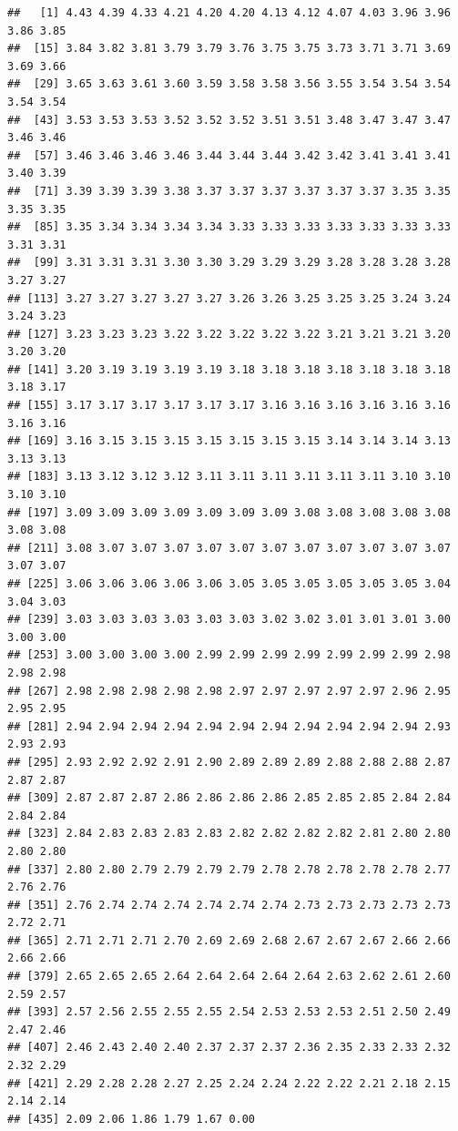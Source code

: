 \documentclass[11pt,]{article}
\begin{document}
\begin{verbatim}
##   [1] 4.43 4.39 4.33 4.21 4.20 4.20 4.13 4.12 4.07 4.03 3.96 3.96 3.86 3.85
##  [15] 3.84 3.82 3.81 3.79 3.79 3.76 3.75 3.75 3.73 3.71 3.71 3.69 3.69 3.66
##  [29] 3.65 3.63 3.61 3.60 3.59 3.58 3.58 3.56 3.55 3.54 3.54 3.54 3.54 3.54
##  [43] 3.53 3.53 3.53 3.52 3.52 3.52 3.51 3.51 3.48 3.47 3.47 3.47 3.46 3.46
##  [57] 3.46 3.46 3.46 3.46 3.44 3.44 3.44 3.42 3.42 3.41 3.41 3.41 3.40 3.39
##  [71] 3.39 3.39 3.39 3.38 3.37 3.37 3.37 3.37 3.37 3.37 3.35 3.35 3.35 3.35
##  [85] 3.35 3.34 3.34 3.34 3.34 3.33 3.33 3.33 3.33 3.33 3.33 3.33 3.31 3.31
##  [99] 3.31 3.31 3.31 3.30 3.30 3.29 3.29 3.29 3.28 3.28 3.28 3.28 3.27 3.27
## [113] 3.27 3.27 3.27 3.27 3.27 3.26 3.26 3.25 3.25 3.25 3.24 3.24 3.24 3.23
## [127] 3.23 3.23 3.23 3.22 3.22 3.22 3.22 3.22 3.21 3.21 3.21 3.20 3.20 3.20
## [141] 3.20 3.19 3.19 3.19 3.19 3.18 3.18 3.18 3.18 3.18 3.18 3.18 3.18 3.17
## [155] 3.17 3.17 3.17 3.17 3.17 3.17 3.16 3.16 3.16 3.16 3.16 3.16 3.16 3.16
## [169] 3.16 3.15 3.15 3.15 3.15 3.15 3.15 3.15 3.14 3.14 3.14 3.13 3.13 3.13
## [183] 3.13 3.12 3.12 3.12 3.11 3.11 3.11 3.11 3.11 3.11 3.10 3.10 3.10 3.10
## [197] 3.09 3.09 3.09 3.09 3.09 3.09 3.09 3.08 3.08 3.08 3.08 3.08 3.08 3.08
## [211] 3.08 3.07 3.07 3.07 3.07 3.07 3.07 3.07 3.07 3.07 3.07 3.07 3.07 3.07
## [225] 3.06 3.06 3.06 3.06 3.06 3.05 3.05 3.05 3.05 3.05 3.05 3.04 3.04 3.03
## [239] 3.03 3.03 3.03 3.03 3.03 3.03 3.02 3.02 3.01 3.01 3.01 3.00 3.00 3.00
## [253] 3.00 3.00 3.00 3.00 2.99 2.99 2.99 2.99 2.99 2.99 2.99 2.98 2.98 2.98
## [267] 2.98 2.98 2.98 2.98 2.98 2.97 2.97 2.97 2.97 2.97 2.96 2.95 2.95 2.95
## [281] 2.94 2.94 2.94 2.94 2.94 2.94 2.94 2.94 2.94 2.94 2.94 2.93 2.93 2.93
## [295] 2.93 2.92 2.92 2.91 2.90 2.89 2.89 2.89 2.88 2.88 2.88 2.87 2.87 2.87
## [309] 2.87 2.87 2.87 2.86 2.86 2.86 2.86 2.85 2.85 2.85 2.84 2.84 2.84 2.84
## [323] 2.84 2.83 2.83 2.83 2.83 2.82 2.82 2.82 2.82 2.81 2.80 2.80 2.80 2.80
## [337] 2.80 2.80 2.79 2.79 2.79 2.79 2.78 2.78 2.78 2.78 2.78 2.77 2.76 2.76
## [351] 2.76 2.74 2.74 2.74 2.74 2.74 2.74 2.73 2.73 2.73 2.73 2.73 2.72 2.71
## [365] 2.71 2.71 2.71 2.70 2.69 2.69 2.68 2.67 2.67 2.67 2.66 2.66 2.66 2.66
## [379] 2.65 2.65 2.65 2.64 2.64 2.64 2.64 2.64 2.63 2.62 2.61 2.60 2.59 2.57
## [393] 2.57 2.56 2.55 2.55 2.55 2.54 2.53 2.53 2.53 2.51 2.50 2.49 2.47 2.46
## [407] 2.46 2.43 2.40 2.40 2.37 2.37 2.37 2.36 2.35 2.33 2.33 2.32 2.32 2.29
## [421] 2.29 2.28 2.28 2.27 2.25 2.24 2.24 2.22 2.22 2.21 2.18 2.15 2.14 2.14
## [435] 2.09 2.06 1.86 1.79 1.67 0.00
\end{verbatim}
\end{document}
